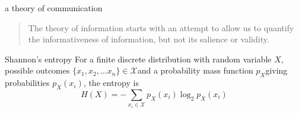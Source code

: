 \documentclass{beamer}
\newcommand{\crish}{\color{reddish}}
\newcommand{\cbla}{\color{black}}
\newcommand{\sm}{\color{reddish}$}
\newcommand{\fm}{$\color{black}}
\begin{document}
\begin{frame}{a theory of communication}
  \begin{quote}
    The theory of information starts with an attempt to allow us to
quantify the informativeness of information, but not its salience or
validity.
  \end{quote}
  \end{frame}

\begin{frame}{Shannon's entropy}
  For a finite discrete distribution with random variable \sm X\fm,
  possible outcomes \sm\{x_1,x_2,\ldots x_n\}\in\mathcal{X}\fm and a
  probability mass function \sm p_X\fm giving probabilities \sm p_X(x_i)\fm, the
  entropy is
\crish
  $$
H(X)=-\sum_{x_i\in \mathcal{X}}{p_X(x_i)\log_2p_X(x_i)}
  $$
\cbla
\end{frame}
\end{document}
